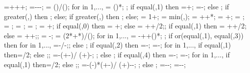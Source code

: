 {{\rightsoilx=\hsdistright+\supportwidth+\buildingwidth+\rightsoildist;
\rightsoily=\rightwallh-\rightsoildepth-\supportheight-\hsdistbottom;
\isospace = (\buildingwidth)/();
for \kiso in {1,...,{\numberofisolators}}{
\xiso{\kiso} = ()*\isospace;
};
if equal(\isoshiftyn,1) then
{=+\isoshift;
\xiso{\numberofisolators}=\xiso{\numberofisolators}-\isoshift;}
else {};
if greater(\doflocfloor,\storynumber) then {;} else{};
if greater(\dofloccolumn,\columnnumber) then {;} else{};
\dofloch = 1+\doflocfloor;
\minlen = min(\storyheight,\baywidth);
\dofxx = \x{\dofloccolumn}+\dofoffsetratio*\minlen+*\showdefl;
\dofyy = \y{\dofloch}+\dofoffsetratio*\minlen;
\arrlen = \arrowlenratio*\minlen;
\arrrad = \rotarrowlenratio*\minlen;
\Xaxesstarty = ;
\Yaxesstartx = ;
\Yaxesstarty = \y{\levelnumber}+\axisseperation;
if equal(\showsupports,0) then
{\Xaxesstartx = \x{\columnnumber}+\axisseperation;} else
{\Xaxesstartx = \x{\columnnumber}+\axisseperation+\supportwidth/2;};
if equal(\showsupports,1) then
{\Xaxesstartx = \x{\columnnumber}+\axisseperation+\supportwidth/2;} else
{\Xaxesstartx = \x{\columnnumber}+\axisseperation+\supportwidth;};
\pilecoordy = -\supportheight;
\pilespace = 
(2*\supportwidth+*\pilesidespace)/();
for \pileind in {1,...,{\numberofpiles}}{
\pilecoordx{\pileind} = -\supportwidth+\pilesidespace+()*\pilespace;
};
if or(equal(\latloadtype,1), equal(\latloadtype,3)) then {
for \iarr in {1,...,{\levelnumber}}{
	\arrstartx{\iarr}=-\toparrlen*\y{\iarr}/\structheight-\latloadshift;};
} else {};
if equal(\latloadtype,2) then {
	=-\latloadshift;
	=-\isomidy;
	for \iarr in {1,...,{\levelnumber}}{
		if equal(\iarr,1) then{\addtempy=\supportheight/2;} else {;};
		\arrstartx{\iarr}=-\toparrlen*(\y{\iarr}+\isomidy-\addtempy)/
		(\structheight+\isomidy)-\latloadshift;
	};
} else {};
if equal(\latloadtype,4) then {
	=-\latloadshift;
	=-\isomidy;
	for \iarr in {1,...,{\levelnumber}}{
		if equal(\iarr,1) then{\addtempy=\supportheight/2;} else {;};
		\arrstartx{\iarr}=-(\toparrlen-\basearrlen)*(\y{\iarr}+\isomidy-\addtempy)/
		(\structheight+\isomidy)-\latloadshift-\basearrlen;
	};
} else {};
\engbedrockstartx=-\leftsoildist-\engbedrockleftdist;
\engbedrockstarty=-\soilbelowfoundtof-\engbedrockdepth;
}}
